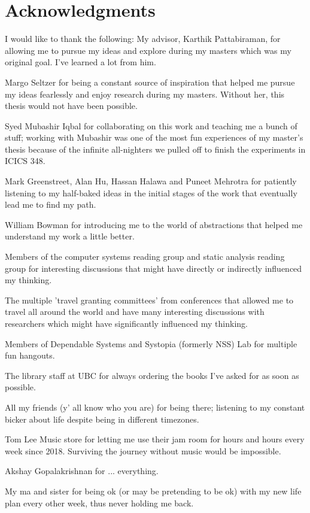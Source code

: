 
\chapter{Acknowledgments}

I would like to thank the following:
My advisor, Karthik Pattabiraman, for allowing me to pursue my ideas and explore during my masters which was my original goal. I've learned a lot from him. 

Margo Seltzer for being a constant source of inspiration that helped me pursue my ideas fearlessly and enjoy research during my masters. Without her, this thesis would not have been possible. 

Syed Mubashir Iqbal for collaborating on this work and teaching me a bunch of stuff; working with Mubashir was one of the most fun experiences of my master's thesis because of the infinite all-nighters we pulled off to finish the experiments in ICICS 348. 

Mark Greenstreet, Alan Hu, Hassan Halawa and Puneet Mehrotra for patiently listening to my half-baked ideas in the initial stages of the work that eventually lead me to find my path. 

William Bowman for introducing me to the world of abstractions that helped me understand my work a little better.  

Members of the computer systems reading group and static analysis reading group for interesting discussions that might have directly or indirectly influenced my thinking. 

The multiple 'travel granting committees' from conferences that allowed me to
travel all around the world and have many interesting discussions with researchers which might have significantly influenced my thinking. 

Members of Dependable Systems and Systopia (formerly NSS) Lab for multiple fun hangouts. 

The library staff at UBC for always ordering the books I've asked for as soon as possible.

All my friends (y' all know who you are) for being there; listening to my constant bicker about life despite being in different timezones.   

Tom Lee Music store for letting me use their jam room for hours and hours every week since 2018. Surviving the journey without music would be impossible. 

Akshay Gopalakrishnan for ... everything. 

My ma and sister for being ok (or may be pretending to be ok) with my new life plan every other week, thus never holding me back. 




